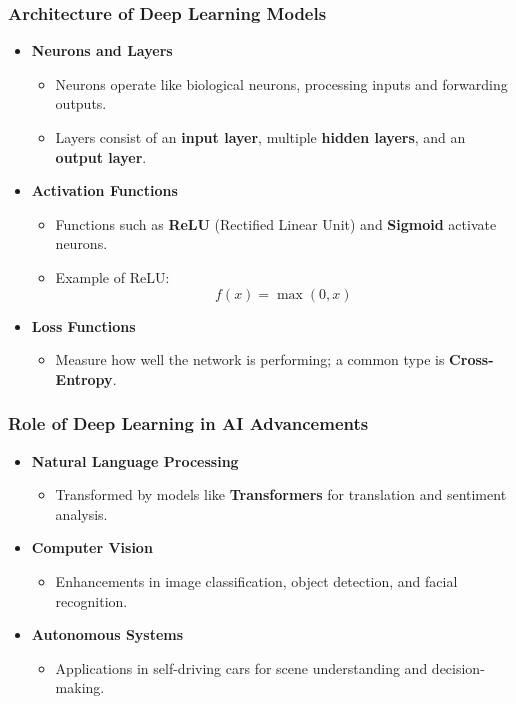 \documentclass[aspectratio=169]{beamer}
\begin{document}
\begin{frame}[fragile]
    \frametitle{Architecture of Deep Learning Models}
    \begin{itemize}
        \item \textbf{Neurons and Layers}
            \begin{itemize}
                \item Neurons operate like biological neurons, processing inputs and forwarding outputs.
                \item Layers consist of an \textbf{input layer}, multiple \textbf{hidden layers}, and an \textbf{output layer}.
            \end{itemize}
        \item \textbf{Activation Functions}
            \begin{itemize}
                \item Functions such as \textbf{ReLU} (Rectified Linear Unit) and \textbf{Sigmoid} activate neurons.
                \item Example of ReLU:
                \begin{equation}
                    f(x) = \max(0, x)
                \end{equation}
            \end{itemize}
        \item \textbf{Loss Functions}
            \begin{itemize}
                \item Measure how well the network is performing; a common type is \textbf{Cross-Entropy}.
            \end{itemize}
    \end{itemize}
\end{frame}

\begin{frame}[fragile]
    \frametitle{Role of Deep Learning in AI Advancements}
    \begin{itemize}
        \item \textbf{Natural Language Processing}
            \begin{itemize}
                \item Transformed by models like \textbf{Transformers} for translation and sentiment analysis.
            \end{itemize}
        \item \textbf{Computer Vision}
            \begin{itemize}
                \item Enhancements in image classification, object detection, and facial recognition.
            \end{itemize}
        \item \textbf{Autonomous Systems}
            \begin{itemize}
                \item Applications in self-driving cars for scene understanding and decision-making.
            \end{itemize}
    \end{itemize}
\end{frame}
\end{document}
